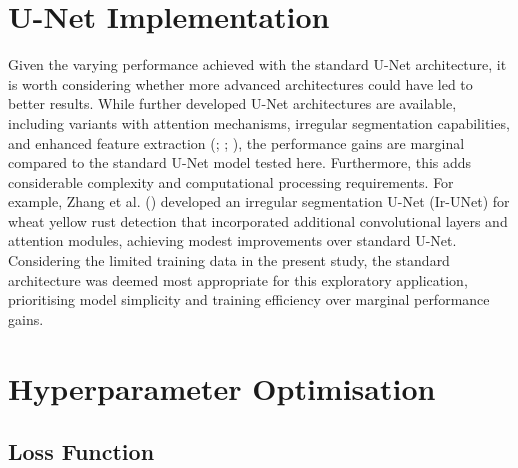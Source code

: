 \documentclass[
]{scrreprt}
\begin{document}
\section{U-Net Implementation}\label{u-net-implementation}

Given the varying performance achieved with the standard U-Net
architecture, it is worth considering whether more advanced
architectures could have led to better results. While further developed
U-Net architectures are available, including variants with attention
mechanisms, irregular segmentation capabilities, and enhanced feature
extraction (;
;
), the
performance gains are marginal compared to the standard U-Net model
tested here. Furthermore, this adds considerable complexity and
computational processing requirements. For example, Zhang et al.
() developed an irregular
segmentation U-Net (Ir-UNet) for wheat yellow rust detection that
incorporated additional convolutional layers and attention modules,
achieving modest improvements over standard U-Net. Considering the
limited training data in the present study, the standard architecture
was deemed most appropriate for this exploratory application,
prioritising model simplicity and training efficiency over marginal
performance gains.

\section{Hyperparameter Optimisation}\label{hyperparameter-optimisation}

\subsection{Loss Function}\label{loss-function}
\end{document}
